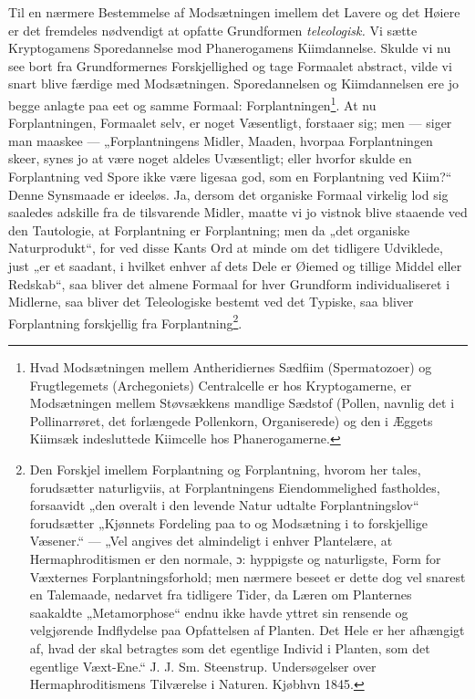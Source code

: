 \documentclass[12pt,a4paper]{book}
\begin{document}

Til en nærmere Bestemmelse af Modsætningen imellem det Lavere og det
Høiere er det fremdeles nødvendigt at opfatte Grundformen
\emph{teleologisk.} Vi sætte Kryptogamens Sporedannelse mod
Phanerogamens Kiimdannelse. Skulde vi nu see bort fra Grundformernes
Forskjellighed og tage Formaalet abstract, vilde vi snart blive færdige
med Modsætningen. Sporedannelsen og Kiimdannelsen ere jo begge anlagte
paa eet og samme Formaal: Forplantningen\footnote{Hvad Modsætningen
mellem Antheridiernes Sædfiim (Spermatozoer) og Frugtlegemets
(Archegoniets) Centralcelle er hos Kryptogamerne, er Modsætningen mellem
Støvsækkens mandlige Sædstof (Pollen, navnlig det i Pollinarrøret, det
forlængede Pollenkorn, Organiserede) og den i Æggets Kiimsæk
indesluttede Kiimcelle hos Phanerogamerne.}. At
\setcounter{footnote}{0}
nu Forplantningen, Formaalet selv, er noget Væsentligt, forstaaer sig;
men --- siger man maaskee --- „Forplantningens Midler, Maaden, hvorpaa
Forplantningen skeer, synes jo at være noget aldeles Uvæsentligt; eller
hvorfor skulde en Forplantning ved Spore ikke være ligesaa god, som en
Forplantning ved Kiim?“ Denne Synsmaade er ideeløs. Ja, dersom det
organiske Formaal virkelig lod sig saaledes adskille fra de tilsvarende
Midler, maatte vi jo vistnok blive staaende ved den Tautologie, at
Forplantning er Forplantning; men da „det organiske Naturprodukt“, for
ved disse Kants Ord at minde om det tidligere Udviklede, just „er et
saadant, i hvilket enhver af dets Dele er Øiemed og tillige Middel eller
Redskab“, saa bliver det almene Formaal for hver Grundform
individualiseret i Midlerne, saa bliver det Teleologiske bestemt ved det
Typiske, saa bliver Forplantning forskjellig fra
Forplantning\footnote{Den Forskjel imellem Forplantning og Forplantning,
hvorom her tales, forudsætter naturligviis, at Forplantningens
Eiendommelighed fastholdes, forsaavidt „den overalt i den levende Natur
udtalte Forplantningslov“ forudsætter „Kjønnets Fordeling paa to og
Modsætning i to forskjellige Væsener.“ --- „Vel angives det almindeligt
i enhver Plantelære, at Hermaphroditismen er den normale, ɔ: hyppigste
og naturligste, Form for Væxternes Forplantningsforhold; men nærmere
beseet er dette dog vel snarest en Talemaade, nedarvet fra tidligere
Tider, da Læren om Planternes saakaldte „Metamorphose“ endnu ikke havde
yttret sin rensende og velgjørende Indflydelse paa Opfattelsen af
Planten. Det Hele er her afhængigt af, hvad der skal betragtes som det
egentlige Individ i Planten, som det egentlige Væxt-Ene.“ J. J. Sm.
Steenstrup. Undersøgelser over Hermaphroditismens Tilværelse i Naturen.
Kjøbhvn 1845.}.
\end{document}
